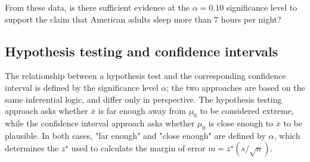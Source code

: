 \begin{exercisewrap}
\begin{nexercise}
From these data, is there sufficient evidence at the $\alpha = 0.10$ significance level to support the claim that American adults sleep more than 7 hours per night?\footnotemark{}
\end{nexercise}
\end{exercisewrap}


\subsection{Hypothesis testing and confidence intervals}

The relationship between a hypothesis test and the corresponding confidence interval is defined by the significance level $\alpha$; the two approaches are based on the same inferential logic, and differ only in perspective. The hypothesis testing approach asks whether $\overline{x}$ is far enough away from $\mu_0$ to be considered extreme, while the confidence interval approach asks whether $\mu_0$ is close enough to $\overline{x}$ to be plausible. In both cases, "far enough" and "close enough" are defined by $\alpha$, which determines the $z^{\star}$ used to calculate the margin of error $m = z^{\star} (s/\sqrt{n}) $.

